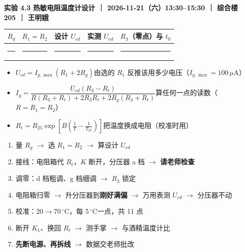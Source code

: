 \documentclass[11pt]{ctexart}
\newcommand{\blankcell}{\rule{0pt}{16pt}\textcolor{black!45}{\rule[-3pt]{1.35cm}{0.4pt}}}
\newcommand{\degC}{\ensuremath{\,^\circ\mathrm{C}}}
\begin{document}
\clearpage
{}

{\small\bfseries 实验 4.3 热敏电阻温度计设计 ｜ 2026-11-21（六）13:30--15:30 ｜ 综合楼 205 ｜ 王明娥}


\begin{center}
\small
\begin{tabular}{@{}p{2.8cm}p{2.8cm}p{2.9cm}p{2.9cm}p{3.2cm}@{}}
\toprule
$R_g$ & $R_1=R_2$ & 设计 $U_{cd}$ & 实测 $U_{cd}$ & $R_3$（零点）与 $t_0$ \\
\midrule
\blankcell & \blankcell & \blankcell & \blankcell & \blankcell \\
\bottomrule
\end{tabular}
\end{center}


\begin{itemize}
\item $U_{cd}=I_{g,\max}(R_1+2R_g)$\quad 由选的 $R_1$ 反推该用多少电压（$I_{g,\max}=100\,\mu$A）
\item $I_g=\dfrac{U_{cd}(R_3-R_t)}{R(R_3+R_t)+2R_3R_t+2R_g(R_3+R_t)}$\quad 算任何一点的读数（$R=R_1=R_2$）
\item $R_t=R_{25}\exp\!\left[B\left(\frac1T-\frac1{T_{25}}\right)\right]$\quad 把温度换成电阻（校准时用）
\end{itemize}


\begin{enumerate}
\item 量 $R_g$ $\to$ 选 $R_1=R_2$ $\to$ 算设计 $U_{cd}$
\item 接线：电阻箱代 $R_t$，$K$ 断开，分压器 a 档 $\to$ \textbf{请老师检查}
\item 调零：d 档粗调、g 档细调 $\to$ $R_3$ 锁定
\item 电阻箱归零 $\to$ 升分压器到\textbf{刚好满偏} $\to$ 万用表测 $U_{cd}$ $\to$ 分压器不动
\item 校准：20$\to$70\degC，每 5\degC 一点，共 11 点
\item 断开 $K_1$、换回 $R_t$ $\to$ 测手掌 $\to$ 与酒精温度计比
\item \textbf{先断电源、再拆线} $\to$ 数据交老师批改
\end{enumerate}

\end{document}
